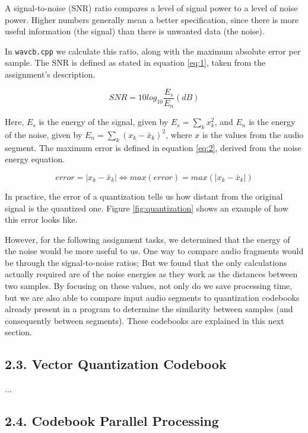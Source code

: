 \documentclass[12pt]{article}
\begin{document}
A signal-to-noise (SNR) ratio compares a level of signal power to a level of 
noise power. 
Higher numbers generally mean a better specification, since there is more useful 
information (the signal) than there is unwanted data (the noise).

In \texttt{wavcb.cpp} we calculate this ratio, along with the maximum absolute 
error per sample. The SNR is defined as stated in equation \ref{eq:1}, taken 
from the assignment's description.

\begin{equation} \label{eq:1}
  SNR = 10 log_{10} \frac{E_{s}}{E_{n}} (dB)
\end{equation}

Here, $E_s$ is the energy of the signal, given by $E_s = \sum_{k} x_k^2$, and
$E_n$ is the energy of the noise, given by $E_n = \sum_{k} (x_k-\bar{x}_k)^2$,
where $x$ is the values from the audio segment.
The maximum error is defined in equation \ref{eq:2}, derived from the noise 
energy equation.

\begin{equation} \label{eq:2}
  error = |x_k-\bar{x}_k| \Leftrightarrow 
  max(error) = max(|x_k-\bar{x}_k|)
\end{equation}

In practice, the error of a quantization tells us how distant from the original
signal is the quantized one.
Figure \ref{fig:quantization} shows an example of how this error looks like.

However, for the following assignment tasks, we determined that the energy of
the noise would be more useful to us.
One way to compare audio fragments would be through the signal-to-noise ratios;
But we found that the only calculations actually required are of the noise 
energies as they work as the distances between two samples.
By focusing on these values, not only do we save processing time, but we are
also able to compare input audio segments to quantization codebooks already 
present in a program to determine the similarity between samples (and 
consequently between segments). These codebooks are explained in this next section.

\subsection*{2.3. Vector Quantization Codebook}

...

\subsection*{2.4. Codebook Parallel Processing}
\end{document}
